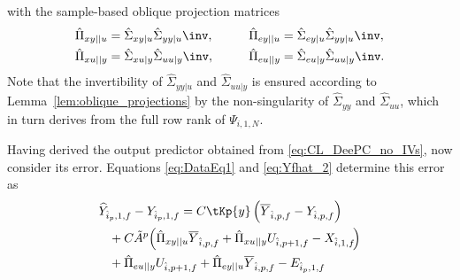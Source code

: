 with the sample-based oblique projection matrices
\begin{alignat*}{3}
    \hat{\Pi}_{xy||u}&=\hat{\Sigma}_{xy|u}\hat{\Sigma}_{yy|u}\inv, \qquad &\hat{\Pi}_{ey||u}&=\hat{\Sigma}_{ey|u}\hat{\Sigma}_{yy|u}\inv,\\
    \hat{\Pi}_{xu||y}&=\hat{\Sigma}_{xu|y}\hat{\Sigma}_{uu|y}\inv,        &\hat{\Pi}_{eu||y}&=\hat{\Sigma}_{eu|y}\hat{\Sigma}_{uu|y}\inv.
\end{alignat*}
Note that the invertibility of $\hat{\Sigma}_{yy|u}$ and $\hat{\Sigma}_{uu|y}$ is ensured according to Lemma~\ref{lem:oblique_projections} by the non-singularity of $\hat{\Sigma}_{yy}$ and $\hat{\Sigma}_{uu}$, which in turn derives from the full row rank of $\Psi_{i,1,N}$.

Having derived the output predictor obtained from \eqref{eq:CL_DeePC_no_IVs}, now consider its error. Equations \eqref{eq:DataEq1} and \eqref{eq:Yfhat_2} determine this error as
%
\begin{align}
    \begin{split}
        &\widehat{Y}_{\hat{i}_p,1,f}-Y_{\hat{i}_p,1,f} = C\tKp{y}\left(\overline{Y}_{\hat{i},p,f}-Y_{\hat{i},p,f}\right)\\
        &\;\;\;+C\tilde{A}^p\!\left(\hat{\Pi}_{xy||u}\overline{Y}_{\hat{i},p,f}+\hat{\Pi}_{xu||y} U_{\hat{i},p+1,f}-X_{\hat{i},1,f}\!\right)\\
        &\;\;\;+\hat{\Pi}_{eu||y}U_{\hat{i},p+1,f}+\hat{\Pi}_{ey||u}\overline{Y}_{\hat{i},p,f}-E_{\hat{i}_p,1,f}
    \end{split}\label{eq:Yf_error1}%
\end{align}
